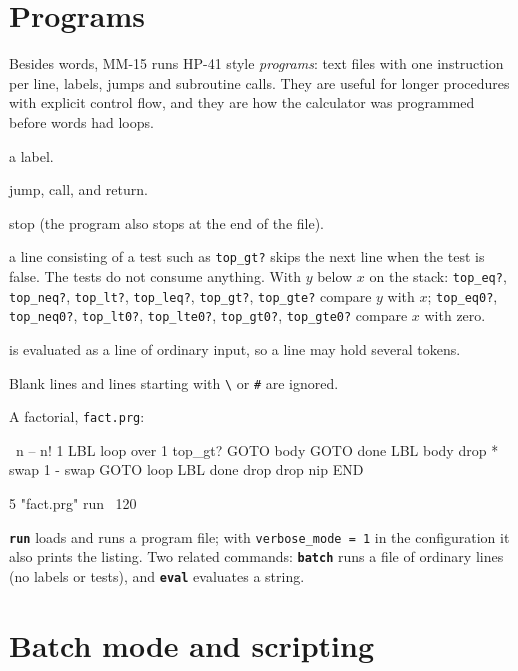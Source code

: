 \documentclass[11pt,letterpaper]{article}
\newcommand{\code}[1]{\texttt{#1}}
\newcommand{\cmd}[1]{\texttt{\textbf{#1}}}
\begin{document}
\section{Programs}

Besides words, MM-15 runs HP-41 style \emph{programs}: text files with one instruction per line, labels, jumps and subroutine calls. They are useful for longer procedures with explicit control flow, and they are how the calculator was programmed before words had loops.

\begin{description}[style=nextline,leftmargin=1.5em]
  \item[\code{LBL name}] a label.
  \item[\code{GOTO name}, \code{GOSUB name}, \code{RTN}] jump, call, and return.
  \item[\code{END}] stop (the program also stops at the end of the file).
  \item[\emph{tests}] a line consisting of a test such as \code{top\_gt?} skips the next line when the test is false. The tests do not consume anything. With $y$ below $x$ on the stack: \code{top\_eq?}, \code{top\_neq?}, \code{top\_lt?}, \code{top\_leq?}, \code{top\_gt?}, \code{top\_gte?} compare $y$ with $x$; \code{top\_eq0?}, \code{top\_neq0?}, \code{top\_lt0?}, \code{top\_lte0?}, \code{top\_gt0?}, \code{top\_gte0?} compare $x$ with zero.
  \item[anything else] is evaluated as a line of ordinary input, so a line may hold several tokens.
\end{description}
Blank lines and lines starting with \code{\textbackslash} or \code{\#} are ignored.

A factorial, \code{fact.prg}:
\begin{rpn}
\ n -- n!
1
LBL loop
over 1
top_gt?
GOTO body
GOTO done
LBL body
drop *
swap 1 - swap
GOTO loop
LBL done
drop drop nip
END
\end{rpn}
\begin{rpn}
5 "fact.prg" run        \ 120
\end{rpn}
\cmd{run} loads and runs a program file; with \code{verbose\_mode = 1} in the configuration it also prints the listing. Two related commands: \cmd{batch} runs a file of ordinary lines (no labels or tests), and \cmd{eval} evaluates a string.

\section{Batch mode and scripting}
\end{document}
